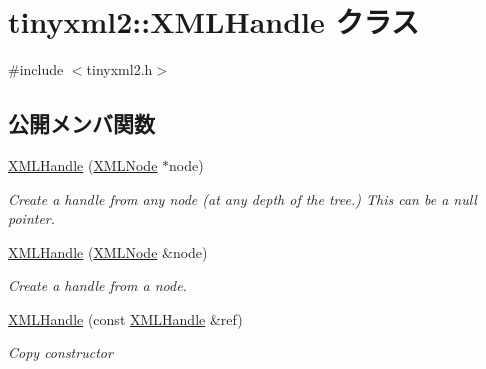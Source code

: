 \hypertarget{classtinyxml2_1_1_x_m_l_handle}{}\section{tinyxml2\+:\+:X\+M\+L\+Handle クラス}
\label{classtinyxml2_1_1_x_m_l_handle}


{\ttfamily \#include $<$tinyxml2.\+h$>$}

\subsection*{公開メンバ関数}
\begin{DoxyCompactItemize}
\item 
\mbox{\label{classtinyxml2_1_1_x_m_l_handle_a9c240a35c18f053509b4b97ddccd9793}} 
\hyperlink{classtinyxml2_1_1_x_m_l_handle_a9c240a35c18f053509b4b97ddccd9793}{X\+M\+L\+Handle} (\hyperlink{classtinyxml2_1_1_x_m_l_node}{X\+M\+L\+Node} $\ast$node)
\begin{DoxyCompactList}\small\item\em Create a handle from any node (at any depth of the tree.) This can be a null pointer. \end{DoxyCompactList}\item 
\mbox{\label{classtinyxml2_1_1_x_m_l_handle_aa2edbc1c0d3e3e8259bd98de7f1cf500}} 
\hyperlink{classtinyxml2_1_1_x_m_l_handle_aa2edbc1c0d3e3e8259bd98de7f1cf500}{X\+M\+L\+Handle} (\hyperlink{classtinyxml2_1_1_x_m_l_node}{X\+M\+L\+Node} \&node)
\begin{DoxyCompactList}\small\item\em Create a handle from a node. \end{DoxyCompactList}\item 
\mbox{\label{classtinyxml2_1_1_x_m_l_handle_afd8e01e6018c07347b8e6d80272466aa}} 
\hyperlink{classtinyxml2_1_1_x_m_l_handle_afd8e01e6018c07347b8e6d80272466aa}{X\+M\+L\+Handle} (const \hyperlink{classtinyxml2_1_1_x_m_l_handle}{X\+M\+L\+Handle} \&ref)
\begin{DoxyCompactList}\small\item\em Copy constructor \end{DoxyCompactList}\item 
\mbox{\label{classtinyxml2_1_1_x_m_l_handle_a75b908322bb4b83be3281b6845252b20}} 

\end{DoxyCompactItemize}
